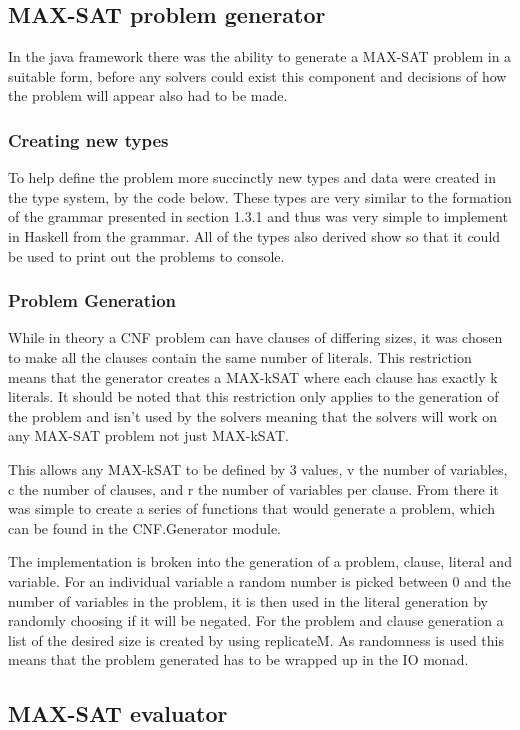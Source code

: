 \documentclass[a4paper]{article}
\begin{document}
\subsection{MAX-SAT problem generator}
In the java framework there was the ability to generate a MAX-SAT problem in a suitable form, before any solvers could exist this component and decisions of how the problem will appear also had to be made.
\subsubsection{Creating new types}
To help define the problem more succinctly new types and data were created in the type system, by the code below.
These types are very similar to the formation of the grammar presented in section 1.3.1 and thus was very simple to implement in Haskell from the grammar.
All of the types also derived show so that it could be used to print out the problems to console.

\subsubsection{Problem Generation}
While in theory a CNF problem can have clauses of differing sizes, it was chosen to make all the clauses contain the same number of literals.
This restriction means that the generator creates a MAX-kSAT where each clause has exactly k literals.
It should be noted that this restriction only applies to the generation of the problem and isn't used by the solvers meaning that the solvers will work on any MAX-SAT problem not just MAX-kSAT\@.
\par
This allows any MAX-kSAT to be defined by 3 values, v the number of variables, c the number of clauses, and r the number of variables per clause.
From there it was simple to create a series of functions that would generate a problem, which can be found in the CNF.Generator module.
\par
The implementation is broken into the generation of a problem, clause, literal and variable.
For an individual variable a random number is picked between 0 and the number of variables in the problem, it is then used in the literal generation by randomly choosing if it will be negated.
For the problem and clause generation a list of the desired size is created by using replicateM.
As randomness is used this means that the problem generated has to be wrapped up in the IO monad.

\subsection{MAX-SAT evaluator}
\end{document}
